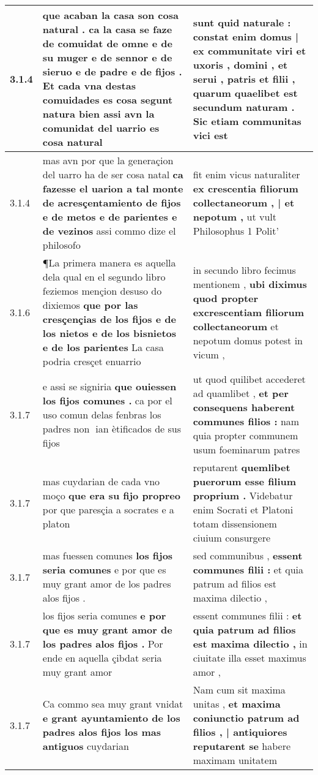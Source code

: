 \begin{tabular}{|p{1cm}|p{6.5cm}|p{6.5cm}|}
3.1.4 & que acaban la casa son cosa natural . \textbf{ ca la casa se faze de comuidat de omne e de su muger e de sennor e de sieruo e de padre e de fijos . Et cada vna destas comuidades es cosa segunt natura bien } assi avn la comunidat del uarrio es cosa natural & sunt quid naturale : \textbf{ constat enim domus | ex communitate viri et uxoris , domini , et serui , patris et filii , quarum quaelibet est secundum naturam . } Sic etiam communitas vici est \\\hline
3.1.4 & mas avn por que la generaçion del uarro ha de ser cosa natal \textbf{ ca fazesse el uarion a tal monte de acresçentamiento de fijos e de metos e de parientes e de vezinos } assi commo dize el philosofo & fit enim vicus naturaliter \textbf{ ex crescentia filiorum collectaneorum , | et nepotum , } ut vult Philosophus 1 Polit’ \\\hline
3.1.6 & ¶La primera manera es aquella dela qual en el segundo libro feziemos mençion desuso do dixiemos \textbf{ que por las cresçençias de los fijos e de los nietos e de los bisnietos e de los parientes } La casa podria cresçet enuarrio & in secundo libro fecimus mentionem , \textbf{ ubi diximus quod propter excrescentiam filiorum collectaneorum } et nepotum domus potest in vicum , \\\hline
3.1.7 & e assi se signiria \textbf{ que ouiessen los fijos comunes . } ca por el uso comun delas fenbras los padres non ian ètificados de sus fijos & ut quod quilibet accederet ad quamlibet , \textbf{ et per consequens haberent communes filios : } nam quia propter communem usum foeminarum patres \\\hline
3.1.7 & mas cuydarian de cada vno moço \textbf{ que era su fijo propreo } por que paresçia a socrates e a platon & reputarent \textbf{ quemlibet puerorum esse filium proprium . } Videbatur enim Socrati et Platoni totam dissensionem ciuium consurgere \\\hline
3.1.7 & mas fuessen comunes \textbf{ los fijos seria comunes } e por que es muy grant amor de los padres alos fijos . & sed communibus , \textbf{ essent communes filii : } et quia patrum ad filios est maxima dilectio , \\\hline
3.1.7 & los fijos seria comunes \textbf{ e por que es muy grant amor de los padres alos fijos . } Por ende en aquella çibdat seria muy grant amor & essent communes filii : \textbf{ et quia patrum ad filios est maxima dilectio , } in ciuitate illa esset maximus amor , \\\hline
3.1.7 & Ca commo sea muy grant vnidat \textbf{ e grant ayuntamiento de los padres alos fijos los mas antiguos } cuydarian & Nam cum sit maxima unitas , \textbf{ et maxima coniunctio patrum ad filios , | antiquiores reputarent se } habere maximam unitatem \\\hline

\end{tabular}
